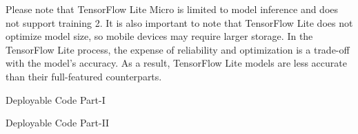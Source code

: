 Please note that TensorFlow Lite Micro is limited to model inference and does not support training 2. It is also important to note that TensorFlow Lite does not optimize model size, so mobile devices may require larger storage. In the TensorFlow Lite process, the expense of reliability and optimization is a trade-off with the model’s accuracy. As a result, TensorFlow Lite models are less accurate than their full-featured counterparts.

\begin{code}[h!]
	    
	\caption{Deployable Code Part-I}
	\label{code:DeployableCode}
\end{code}
\begin{code}[h!]
	    
	\caption{Deployable Code Part-II }
	\label{code:DeployableCodeII}
\end{code}